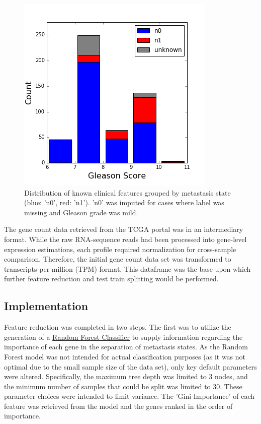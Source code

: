 \documentclass[final]{article}
\begin{document}
\begin{figure}
  \centering
  \includegraphics[scale=0.5]{GleasonHist2}
  \caption{Distribution of known clinical features grouped by metastasis state (blue: 'n0', red: 'n1').\label{fig:postGSHist}
  'n0' was imputed for cases where label was missing and Gleason grade was mild.}
\end{figure}

The gene count data retrieved from the TCGA portal was in an intermediary
format.  While the raw RNA-sequence reads had been processed into gene-level
expression estimations, each profile required normalization for
cross-sample comparison.   Therefore, the initial gene count data set was transformed to
transcripts per million (TPM) format.  This dataframe was the base upon
which further feature reduction and test train splitting would be performed.

\subsection{Implementation}

Feature reduction was completed in two steps.  The first was to utilize the
generation of a
\href{http://scikit-learn.org/stable/modules/generated/sklearn.ensemble.RandomForestClassifier.html#sklearn.ensemble.RandomForestClassifier}{Random
Forest Classifier} to supply information regarding the importance of each gene
in the separation of metastasis states.  As the Random Forest model was not
intended for actual classification purposes (as it was not optimal due to the small sample
size of the data set), only key default parameters were altered. Specifically,
the maximum tree depth was limited to 3 nodes, and the minimum number of samples
that could be split was limited to 30.  These parameter choices were intended to
limit variance.  The 'Gini Importance' of each feature was retrieved from the
model and the genes ranked in the order of importance.
\end{document}
